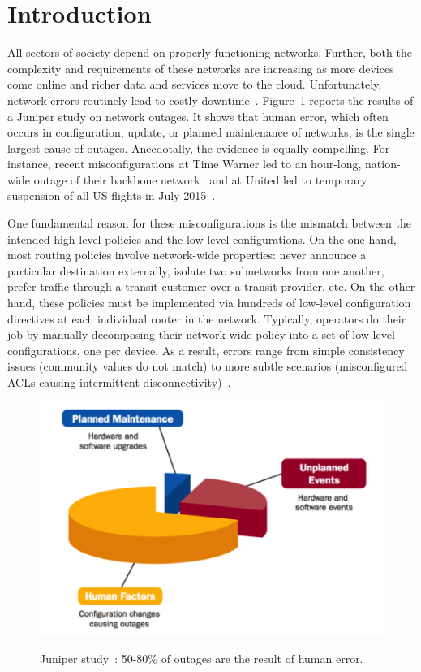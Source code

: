 \section{Introduction}

All sectors of society depend on properly functioning networks.  Further, both the complexity and requirements of these networks are increasing as more devices come online and richer data and services move to the cloud.  Unfortunately, network errors routinely lead to costly downtime~\cite{mahajan+:bgp-misconfiguration,feamster+:rcc,batfish,dc-failure-study}.
Figure~\ref{fig:network-downtime} reports the results of a Juniper
study on network outages.  It shows that human error, which often occurs in configuration, update, or planned maintenance of networks, is the single largest cause of outages. 
Anecdotally, the evidence is equally compelling.  For instance, recent misconfigurations at
Time Warner led to an hour-long, nation-wide outage of their backbone network~\cite{time-warner} and at United led to temporary suspension of all US flights in July 2015~\cite{united}.

One fundamental reason for these misconfigurations is the
mismatch between the intended high-level
policies and the low-level configurations.  On the one hand, most routing policies involve
network-wide properties:  never announce a particular destination externally, isolate two subnetworks from one another, prefer traffic through a transit customer over a transit provider, etc.
On the other hand, these policies must be implemented via hundreds of low-level configuration directives at each individual router in the network.  Typically, operators do their job by manually
decomposing their network-wide policy into a set of low-level configurations,
one per device.  As a result, errors range from simple consistency issues (community values do not match) to more subtle scenarios (misconfigured ACLs causing intermittent disconnectivity)~\cite{feamster+:rcc,batfish}.

\begin{figure}
  \centering
  \includegraphics[width=.35\textwidth]{figures/errors2} \\
  \caption{
Juniper study~\cite{juniper-study}: 50-80\% of outages are the result of human error.}
  \label{fig:network-downtime}
\end{figure}

